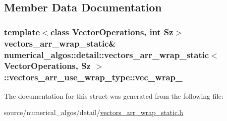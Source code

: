 \subsection{Member Data Documentation}
\hypertarget{structnumerical__algos_1_1detail_1_1vectors__arr__wrap__static_1_1vectors__arr__use__wrap__type_a534c2d7668748a1bd34cba7bfb179975}{
\subsubsection[{vec\-\_\-wrap\-\_\-}]{\setlength{\rightskip}{0pt plus 5cm}template$<$class Vector\-Operations, int Sz$>$ {\bf vectors\-\_\-arr\-\_\-wrap\-\_\-static}\& {\bf numerical\-\_\-algos\-::detail\-::vectors\-\_\-arr\-\_\-wrap\-\_\-static}$<$ Vector\-Operations, Sz $>$\-::vectors\-\_\-arr\-\_\-use\-\_\-wrap\-\_\-type\-::vec\-\_\-wrap\-\_\-}}\label{structnumerical__algos_1_1detail_1_1vectors__arr__wrap__static_1_1vectors__arr__use__wrap__type_a534c2d7668748a1bd34cba7bfb179975}


The documentation for this struct was generated from the following file\-:\begin{DoxyCompactItemize}
\item 
source/numerical\-\_\-algos/detail/\hyperlink{vectors__arr__wrap__static_8h}{vectors\-\_\-arr\-\_\-wrap\-\_\-static.\-h}\end{DoxyCompactItemize}
